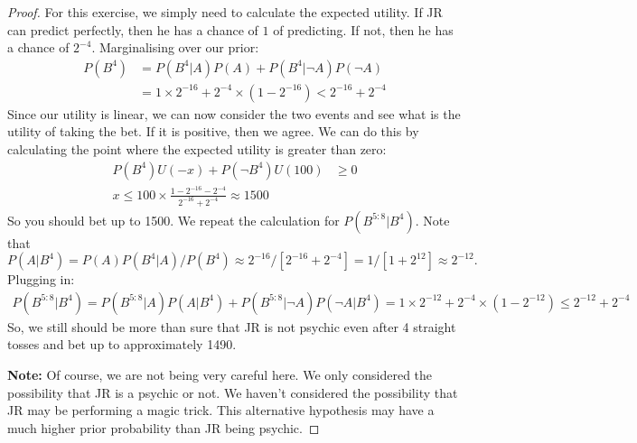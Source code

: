 \documentclass[twoside,a4paper]{article}
\begin{document}
\begin{proof}
  For this exercise, we simply need to calculate the expected utility. If JR can predict perfectly, then he has a chance of $1$ of predicting. If not, then he has a chance of $2^{-4}$. Marginalising over our prior:
  \begin{align*}
    P(B^4) &= P(B^4 | A) P(A) + P(B^4 | \neg A) P(\neg A)\\
             &=  1 \times 2^{-16} + 2^{-4} \times (1 - 2^{-16}) < 2^{-16} + 2^{-4} 
  \end{align*}
  Since our utility is linear, we can now consider the two events and see what is the utility of taking the bet. If it is positive, then we agree. We can do this by calculating the point where the expected utility is greater than zero:
  \begin{align*}
    P(B^4) U(-x) + P(\neg B^{4}) U(100) &\geq 0\\
    x \leq 100 \times \frac{1 - 2^{-16} - 2^{-4}}{2^{-16} + 2^{-4}} \approx 1500
  \end{align*}
  So you should bet up to 1500.
   We repeat the calculation for $P(B^{5:8} | B^4)$. Note that
  \[
    P(A | B^4) = P(A) P(B^4 | A) / P(B^4) \approx 2^{-16} /[2^{-16} + 2^{-4}] = 1 / [1 + 2^{12}] \approx 2^{-12}.
  \]
  Plugging in:
  \begin{align*}
    P(B^{5:8} | B^4) = P(B^{5:8} | A) P(A | B^4) + P(B^{5:8} | \neg A) P(\neg A | B^4) =  1 \times 2^{-12} + 2^{-4} \times (1 - 2^{-12}) \leq 2^{-12} + 2^{-4} 
  \end{align*}
  So, we still should be more than sure that JR is not psychic even after 4 straight tosses and bet up to approximately 1490. 

  \textbf{Note:} Of course, we are not being very careful here. We only considered the possibility that JR is a psychic or not. We haven't considered the possibility that JR may be performing a magic trick. This alternative hypothesis may have a much higher prior probability than JR being psychic.
  
\end{proof}
\end{document}
